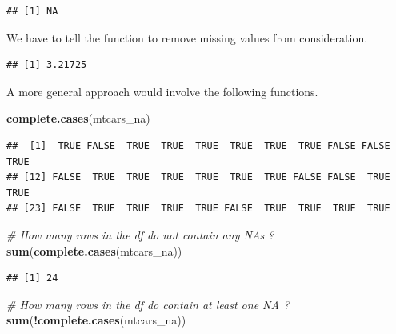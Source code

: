 \documentclass[]{book}
\newenvironment{Shaded}{\begin{snugshade}}{\end{snugshade}}
\newcommand{\CommentTok}[1]{\textcolor[rgb]{0.56,0.35,0.01}{\textit{#1}}}
\newcommand{\DataTypeTok}[1]{\textcolor[rgb]{0.13,0.29,0.53}{#1}}
\newcommand{\KeywordTok}[1]{\textcolor[rgb]{0.13,0.29,0.53}{\textbf{#1}}}
\newcommand{\NormalTok}[1]{#1}
\newcommand{\OperatorTok}[1]{\textcolor[rgb]{0.81,0.36,0.00}{\textbf{#1}}}
\newcommand{\OtherTok}[1]{\textcolor[rgb]{0.56,0.35,0.01}{#1}}
\begin{document}
\begin{verbatim}
## [1] NA
\end{verbatim}

We have to tell the function to remove missing values from consideration.

\begin{Shaded}
\end{Shaded}

\begin{verbatim}
## [1] 3.21725
\end{verbatim}

A more general approach would involve the following functions.

\begin{Shaded}
\begin{Highlighting}[]
\KeywordTok{complete.cases}\NormalTok{(mtcars_na)}
\end{Highlighting}
\end{Shaded}

\begin{verbatim}
##  [1]  TRUE FALSE  TRUE  TRUE  TRUE  TRUE  TRUE  TRUE FALSE FALSE  TRUE
## [12] FALSE  TRUE  TRUE  TRUE  TRUE  TRUE  TRUE FALSE FALSE  TRUE  TRUE
## [23] FALSE  TRUE  TRUE  TRUE  TRUE FALSE  TRUE  TRUE  TRUE  TRUE
\end{verbatim}

\begin{Shaded}
\begin{Highlighting}[]
\CommentTok{# How many rows in the df do not contain any NAs ?}
\KeywordTok{sum}\NormalTok{(}\KeywordTok{complete.cases}\NormalTok{(mtcars_na))}
\end{Highlighting}
\end{Shaded}

\begin{verbatim}
## [1] 24
\end{verbatim}

\begin{Shaded}
\begin{Highlighting}[]
\CommentTok{# How many rows in the df do contain at least one NA ?}
\KeywordTok{sum}\NormalTok{(}\OperatorTok{!}\KeywordTok{complete.cases}\NormalTok{(mtcars_na))}
\end{Highlighting}
\end{Shaded}
\end{document}
